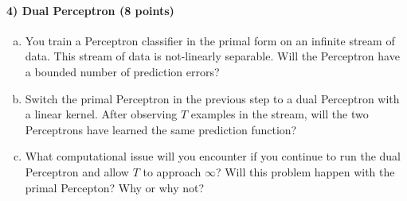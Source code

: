 \documentclass{article}
\begin{document}
\paragraph{4) Dual Perceptron (8 points)} 
\begin{enumerate}[(c)]
	\item You train a Perceptron classifier in the primal form on an infinite stream of data. This stream of data is not-linearly separable. Will the Perceptron have a bounded number of prediction errors?
	\item Switch the primal Perceptron in the previous step to a dual Perceptron with a linear kernel. After observing $T$ examples in the stream, will the two Perceptrons have learned the same prediction function?
	\item What computational issue will you encounter if you continue to run the dual Perceptron and allow $T$ to approach $\infty$? Will this problem happen with the primal Percepton? Why or why not?
\end{enumerate}
\end{document}
